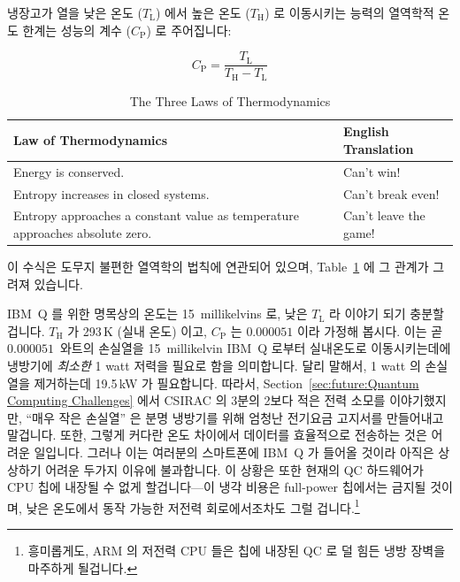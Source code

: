 \newcommand{\TLo}{T_\mathrm{L}}
\newcommand{\THi}{T_\mathrm{H}}
\newcommand{\CPf}{C_\mathrm{P}}

냉장고가 열을 낮은 온도 ($\TLo$) 에서 높은 온도 ($\THi$) 로 이동시키는 능력의
열역학적 온도 한계는 성능의 계수 ($\CPf$) 로 주어집니다:

\begin{equation}
	\CPf = \frac{\TLo}{\THi - \TLo}
\end{equation}

\begin{table}
\centering\footnotesize
\begin{tabular}{p{1.7in}|p{0.95in}}
Law of Thermodynamics
	& English Translation \\
\hline
\hline
Energy is conserved.
	& Can't win! \\
\hline
Entropy increases in closed systems.
	& Can't break even! \\
\hline
Entropy approaches a constant value as temperature approaches absolute zero.
	& Can't leave the game! \\
\end{tabular}
\caption{The Three Laws of Thermodynamics}
\label{tab:future:The Three Laws of Thermodynamics}
\end{table}

이 수식은 도무지 불편한 열역학의 법칙에 연관되어 있으며,
Table~\ref{tab:future:The Three Laws of Thermodynamics} 에 그 관계가 그려져
있습니다.

IBM~Q 를 위한 명목상의 온도는 15~millikelvins 로, 낮은 $\TLo$ 라 이야기 되기
충분할 겁니다.
$\THi$ 가 293\,K (실내 온도) 이고, $\CPf$ 는 $0.000051$ 이라 가정해 봅시다.
이는 곧 $0.000051$~와트의 손실열을 15~millikelvin IBM~Q 로부터 실내온도로
이동시키는데에 냉방기에 \emph{최소한} 1 watt 저력을 필요로 함을 의미합니다.
달리 말해서, 1 watt 의 손실열을 제거하는데 19.5\,kW 가 필요합니다.
따라서,
Section~\ref{sec:future:Quantum Computing Challenges} 에서 CSIRAC 의 3분의
2보다 적은 전력 소모를 이야기했지만, ``매우 작은 손실열'' 은 분명 냉방기를 위해
엄청난 전기요금 고지서를 만들어내고 말겁니다.
또한, 그렇게 커다란 온도 차이에서 데이터를 효율적으로 전송하는 것은 어려운
일입니다.
그러나 이는 여러분의 스마트폰에 IBM~Q 가 들어올 것이라 아직은 상상하기 어려운
두가지 이유에 불과합니다.
이 상황은 또한 현재의 QC 하드웨어가 CPU 칩에 내장될 수 없게 할겁니다---이 냉각
비용은 full-power 칩에서는 금지될 것이며, 낮은 온도에서 동작 가능한 저전력
회로에서조차도 그럴 겁니다.\footnote{
	흥미롭게도, ARM 의 저전력 CPU 들은 칩에 내장된 QC 로 덜 힘든 냉방
	장벽을 마주하게 될겁니다.}
\iffalse

